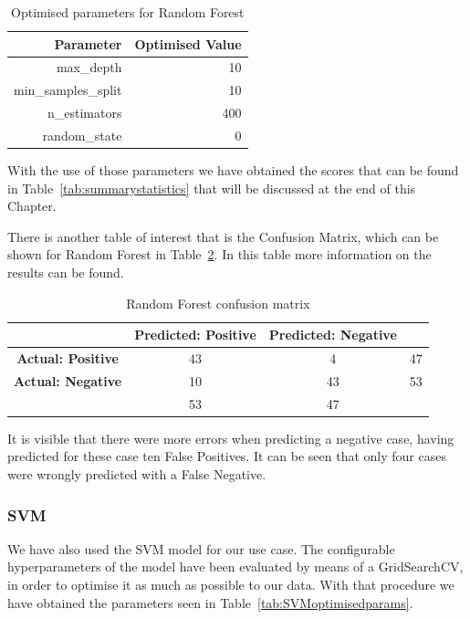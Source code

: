 \begin{table}[htp]
\centering
\begin{tabular}{|r|r|}
\hline
\textbf{Parameter}  & \textbf{Optimised Value} \\ \hline
max\_depth          & 10                       \\ \hline
min\_samples\_split & 10                       \\ \hline
n\_estimators       & 400                      \\ \hline
random\_state       & 0                        \\ \hline
\end{tabular}
\caption{Optimised parameters for Random Forest}
\label{tab:RFoptimisedparams}
\end{table}

With the use of those parameters we have obtained the scores that can be found in Table~\ref{tab:summarystatistics} that will be discussed at the end of this Chapter.

There is another table of interest that is the Confusion Matrix, which can be shown for Random Forest in Table~\ref{tab:RFconfusion}. In this table more information on the results can be found.
\begin{table}[htp]
\centering
\begin{tabular}{|c|c|c|c|}
\hline
\textbf{}                 & \textbf{Predicted: Positive} & \textbf{Predicted: Negative} &    \\ \hline
\textbf{Actual: Positive} & 43                           & 4                            & 47 \\ \hline
\textbf{Actual: Negative} & 10                           & 43                           & 53 \\ \hline
\textbf{}                 & 53                           & 47                           &    \\ \hline
\end{tabular}
\caption{Random Forest confusion matrix}
\label{tab:RFconfusion}
\end{table}

It is visible that there were more errors when predicting a negative case, having predicted for these case ten False Positives. It can be seen that only four cases were wrongly predicted with a False Negative.

\subsubsection{SVM}
We have also used the SVM model for our use case. The configurable hyperparameters of the model have been evaluated by means of a GridSearchCV, in order to optimise it as much as possible to our data. With that procedure we have obtained the parameters seen in Table~\ref{tab:SVMoptimisedparams}.

